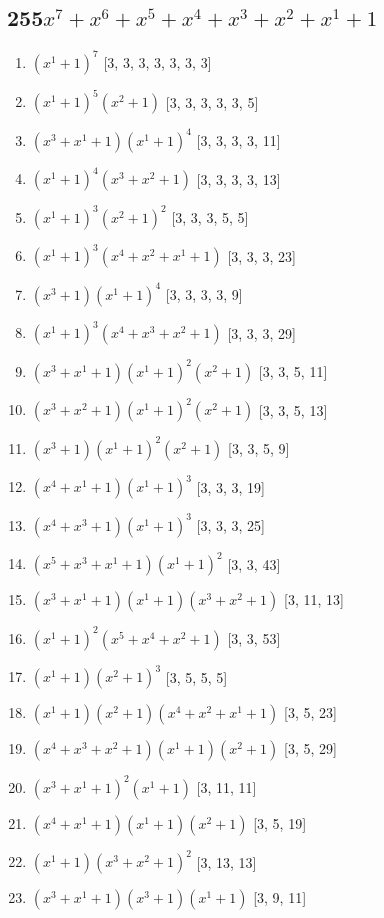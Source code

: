 \documentclass[10pt,twocolumn]{article}
\begin{document}
\subsection*{255$x^{7} + x^{6} + x^{5} + x^{4} + x^{3} + x^{2} + x^{1} + 1$  } 
\begin{enumerate}
\item $(x^{1} + 1)^{7}$  [3, 3, 3, 3, 3, 3, 3]
\item $(x^{1} + 1)^{5}(x^{2} + 1)$  [3, 3, 3, 3, 3, 5]
\item $(x^{3} + x^{1} + 1)(x^{1} + 1)^{4}$  [3, 3, 3, 3, 11]
\item $(x^{1} + 1)^{4}(x^{3} + x^{2} + 1)$  [3, 3, 3, 3, 13]
\item $(x^{1} + 1)^{3}(x^{2} + 1)^{2}$  [3, 3, 3, 5, 5]
\item $(x^{1} + 1)^{3}(x^{4} + x^{2} + x^{1} + 1)$  [3, 3, 3, 23]
\item $(x^{3} + 1)(x^{1} + 1)^{4}$  [3, 3, 3, 3, 9]
\item $(x^{1} + 1)^{3}(x^{4} + x^{3} + x^{2} + 1)$  [3, 3, 3, 29]
\item $(x^{3} + x^{1} + 1)(x^{1} + 1)^{2}(x^{2} + 1)$  [3, 3, 5, 11]
\item $(x^{3} + x^{2} + 1)(x^{1} + 1)^{2}(x^{2} + 1)$  [3, 3, 5, 13]
\item $(x^{3} + 1)(x^{1} + 1)^{2}(x^{2} + 1)$  [3, 3, 5, 9]
\item $(x^{4} + x^{1} + 1)(x^{1} + 1)^{3}$  [3, 3, 3, 19]
\item $(x^{4} + x^{3} + 1)(x^{1} + 1)^{3}$  [3, 3, 3, 25]
\item $(x^{5} + x^{3} + x^{1} + 1)(x^{1} + 1)^{2}$  [3, 3, 43]
\item $(x^{3} + x^{1} + 1)(x^{1} + 1)(x^{3} + x^{2} + 1)$  [3, 11, 13]
\item $(x^{1} + 1)^{2}(x^{5} + x^{4} + x^{2} + 1)$  [3, 3, 53]
\item $(x^{1} + 1)(x^{2} + 1)^{3}$  [3, 5, 5, 5]
\item $(x^{1} + 1)(x^{2} + 1)(x^{4} + x^{2} + x^{1} + 1)$  [3, 5, 23]
\item $(x^{4} + x^{3} + x^{2} + 1)(x^{1} + 1)(x^{2} + 1)$  [3, 5, 29]
\item $(x^{3} + x^{1} + 1)^{2}(x^{1} + 1)$  [3, 11, 11]
\item $(x^{4} + x^{1} + 1)(x^{1} + 1)(x^{2} + 1)$  [3, 5, 19]
\item $(x^{1} + 1)(x^{3} + x^{2} + 1)^{2}$  [3, 13, 13]
\item $(x^{3} + x^{1} + 1)(x^{3} + 1)(x^{1} + 1)$  [3, 9, 11]

\end{enumerate}
\end{document}
